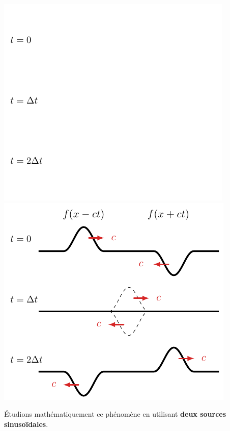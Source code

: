\documentclass[../../main/main.tex]{subfiles}
\begin{document}
\begin{tcb}[sidebyside]
\begin{center}
{			\includegraphics[width=.9\linewidth]{sum_pulse-dst_stud.pdf}
		}{%
			\includegraphics[width=.9\linewidth]{sum_pulse-dst_prof.pdf}
		}%
	\end{center}
\end{tcb}

Étudions mathématiquement ce phénomène en utilisant \textbf{deux sources
	sinusoïdales}.
\end{document}
